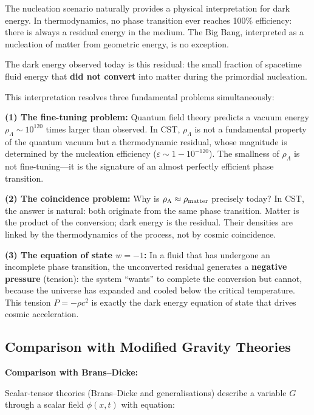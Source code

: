 \documentclass[11pt,a4paper]{article}
\begin{document}
The nucleation scenario naturally provides a physical interpretation for dark energy. In thermodynamics, no phase transition ever reaches 100\% efficiency: there is always a residual energy in the medium. The Big Bang, interpreted as a nucleation of matter from geometric energy, is no exception.

The dark energy observed today is this residual: the small fraction of spacetime fluid energy that \textbf{did not convert} into matter during the primordial nucleation.

This interpretation resolves three fundamental problems simultaneously:

\textbf{(1) The fine-tuning problem:} Quantum field theory predicts a vacuum energy $\rho_\Lambda \sim 10^{120}$ times larger than observed. In CST, $\rho_\Lambda$ is not a fundamental property of the quantum vacuum but a thermodynamic residual, whose magnitude is determined by the nucleation efficiency ($\varepsilon \sim 1 - 10^{-120}$). The smallness of $\rho_\Lambda$ is not fine-tuning---it is the signature of an almost perfectly efficient phase transition.

\textbf{(2) The coincidence problem:} Why is $\rho_\Lambda \approx \rho_{\rm matter}$ precisely today? In CST, the answer is natural: both originate from the same phase transition. Matter is the product of the conversion; dark energy is the residual. Their densities are linked by the thermodynamics of the process, not by cosmic coincidence.

\textbf{(3) The equation of state $w = -1$:} In a fluid that has undergone an incomplete phase transition, the unconverted residual generates a \textbf{negative pressure} (tension): the system ``wants'' to complete the conversion but cannot, because the universe has expanded and cooled below the critical temperature. This tension $P = -\rho c^2$ is exactly the dark energy equation of state that drives cosmic acceleration.

\hypertarget{comparison-with-modified-gravity-theories}{%
\subsection{Comparison with Modified Gravity
Theories}\label{comparison-with-modified-gravity-theories}}

\textbf{Comparison with Brans--Dicke:}

Scalar-tensor theories (Brans--Dicke and generalisations) describe a
variable \(G\) through a scalar field \(\phi(x,t)\) with equation:
\end{document}
